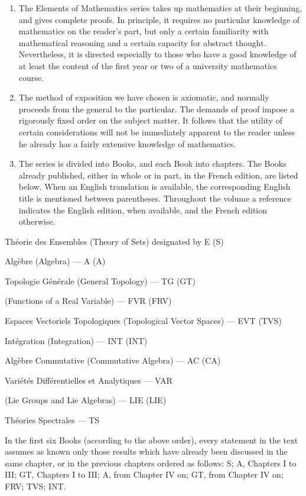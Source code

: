
\begin{enumerate}
\def\labelenumi{\arabic{enumi}.}
\item
  The Elements of Mathematics series takes up mathematics at their beginning, and gives complete proofs. In principle, it requires no particular knowledge of mathematics on the reader's part, but only a certain familiarity with mathematical reasoning and a certain capacity for abstract thought. Nevertheless, it is directed especially to those who have a good knowledge of at least the content of the first year or two of a university mathematics course.
\item
  The method of exposition we have chosen is axiomatic, and normally proceeds from the general to the particular. The demands of proof impose a rigorously fixed order on the subject matter. It follows that the utility of certain considerations will not be immediately apparent to the reader unless he already has a fairly extensive knowledge of mathematics.
\item
  The series is divided into Books, and each Book into chapters. The Books already published, either in whole or in part, in the French edition, are listed below. When an English translation is available, the corresponding English title is mentioned between parentheses. Throughout the volume a reference indicates the English edition, when available, and the French edition otherwise.
\end{enumerate}

Théorie des Ensembles (Theory of Sets) designated by E (S)

Algèbre (Algebra) --- A (A)

Topologie Générale (General Topology) --- TG (GT)

(Functions of a Real Variable) --- FVR (FRV)

Espaces Vectoriels Topologiques (Topological Vector Spaces) --- EVT (TVS)

Intégration (Integration) --- INT (INT)

Algèbre Commutative (Commutative Algebra) --- AC (CA)

Variétés Différentielles et Analytiques --- VAR

(Lie Groups and Lie Algebras) --- LIE (LIE)

Théories Spectrales --- TS

In the first six Books (according to the above order), every statement in the text assumes as known only those results which have already been discussed in the same chapter, or in the previous chapters ordered as follows: S; A, Chapters I to III; GT, Chapters I to III; A, from Chapter IV on; GT, from Chapter IV on; FRV; TVS; INT.

